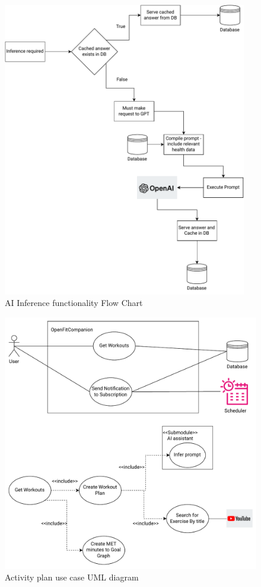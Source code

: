 \begin{figure}
    
    \centering
    \includegraphics[width=0.95\textwidth,keepaspectratio]{../images/ai.pdf}
    \caption{AI Inference functionality Flow Chart}
    \label{fig:5}
    
\end{figure}


\begin{figure}
    
    \centering
    \includegraphics[width=\textwidth,keepaspectratio]{../images/workouts.pdf}
    \caption{Activity plan use case UML diagram}
    \label{fig:6}
    
\end{figure}
